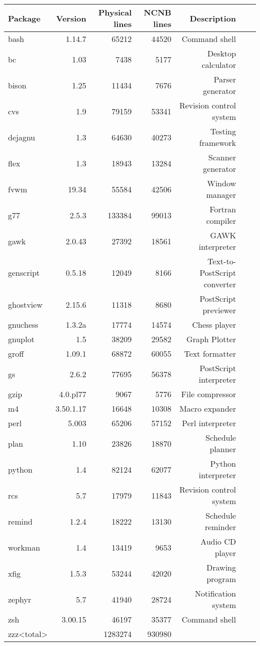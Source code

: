 \begin{tabular}{|l|r|r|r|r|r|r|}\hline
Package & Version & Physical lines & NCNB lines & Description\\\hline
bash & 1.14.7 & 65212 & 44520 & Command shell \\\hline
bc & 1.03 & 7438 & 5177 & Desktop calculator \\\hline
bison & 1.25 & 11434 & 7676 & Parser generator \\\hline
cvs & 1.9 & 79159 & 53341 & Revision control system \\\hline
dejagnu & 1.3 & 64630 & 40273 & Testing framework \\\hline
flex & 1.3 & 18943 & 13284 & Scanner generator \\\hline
fvwm & 19.34 & 55584 & 42506 & Window manager \\\hline
g77 & 2.5.3 & 133384 & 99013 & Fortran compiler \\\hline
gawk & 2.0.43 & 27392 & 18561 & GAWK interpreter \\\hline
genscript & 0.5.18 & 12049 & 8166 & Text-to-PostScript converter \\\hline
ghostview & 2.15.6 & 11318 & 8680 & PostScript previewer \\\hline
gnuchess & 1.3.2a & 17774 & 14574 & Chess player \\\hline
gnuplot & 1.5 & 38209 & 29582 & Graph Plotter \\\hline
groff & 1.09.1 & 68872 & 60055 & Text formatter \\\hline
gs & 2.6.2 & 77695 & 56378 & PostScript interpreter \\\hline
gzip & 4.0.pl77 & 9067 & 5776 & File compressor \\\hline
m4 & 3.50.1.17 & 16648 & 10308 & Macro expander \\\hline
perl & 5.003 & 65206 & 57152 & Perl interpreter \\\hline
plan & 1.10 & 23826 & 18870 & Schedule planner \\\hline
python & 1.4 & 82124 & 62077 & Python interpreter \\\hline
rcs & 5.7 & 17979 & 11843 & Revision control system \\\hline
remind & 1.2.4 & 18222 & 13130 & Schedule reminder \\\hline
workman & 1.4 & 13419 & 9653 & Audio CD player \\\hline
xfig & 1.5.3 & 53244 & 42020 & Drawing program \\\hline
zephyr & 5.7 & 41940 & 28724 & Notification system \\\hline
zsh & 3.00.15 & 46197 & 35377 & Command shell \\\hline
zzz<total> &   & 1283274 & 930980 &  \\\hline
\end{tabular}

